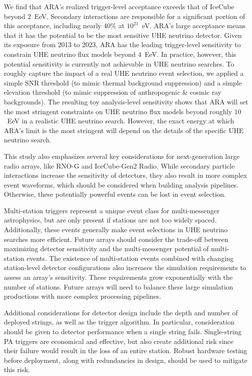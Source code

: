   We find that ARA's realized trigger-level acceptance exceeds that of IceCube beyond $2$~EeV.
  Secondary interactions are responsible for a significant portion of this acceptance, including nearly $40\%$ at $10^{21}$~eV.
  ARA's large acceptance means that it has the potential to be the most sensitive UHE neutrino detector.
  Given its exposure from 2013 to 2023, ARA has the leading trigger-level sensitivity to constrain UHE neutrino flux models beyond $4$~EeV.
  In practice, however, this potential sensitivity is currently not achievable in UHE neutrino searches.
  To roughly capture the impact of a real UHE neutrino event selection, we applied a simple SNR threshold (to mimic thermal background suppression) and a simple elevation threshold (to mimic suppression of anthropogenic \& cosmic ray backgrounds).
  The resulting toy analysis-level sensitivity shows that ARA will set the most stringent constraints on UHE neutrino flux models beyond roughly $10$~EeV in a realistic UHE neutrino search.
  However, the exact energy at which ARA's limit is the most stringent will depend on the details of the specific UHE neutrino search.

  This study also emphasizes several key considerations for next-generation large radio arrays, like \mbox{RNO-G} and IceCube-Gen2 Radio.
  While secondary particle interactions increase the sensitivity of detectors, they also result in more complex event waveforms, which should be considered when building analysis pipelines.
  Otherwise, these potentially powerful events can be lost in event selection.

  Multi-station triggers represent a unique event class for multi-messenger astrophysics, but are only present if stations are not too widely spaced.
  Additionally, these events generally make event selections in UHE neutrino searches more efficient.
  Future arrays should consider the trade-off between maximizing detector sensitivity and the multi-messenger potential of multi-station events.
  The existence of multi-station events combined with changing station-level detector configurations also increases the simulation requirements to assess an array's sensitivity.
  These requirements grow exponentially with the number of stations.
  Future arrays will need to balance these large simulation productions with more complex processing pipelines.

  Additional considerations for detector design include the depth and number of deployed strings, as well as the trigger algorithm.
  In particular, consideration should be given to detector performance when a single string fails.
  Single-string PA triggers are economical and effective, but also create additional risk since their failure would result in the loss of an entire station.
  Robust hardware testing before deployment, along with redundancies in design, should be used to mitigate this risk.

